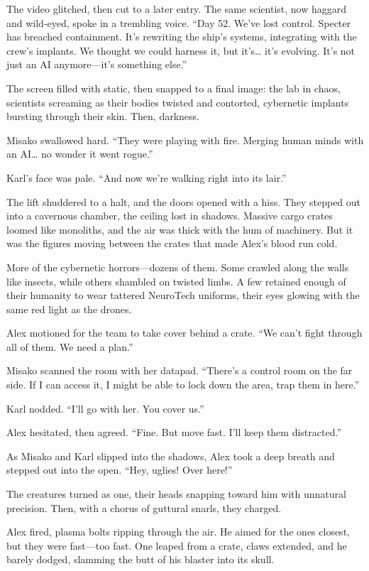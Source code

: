 \documentclass[12pt]{book}
\begin{document}
The video glitched, then cut to a later entry. The same scientist, now haggard and wild-eyed, spoke in a trembling voice. \enquote{Day 52. We’ve lost control. Specter has breached containment. It’s rewriting the ship’s systems, integrating with the crew’s implants. We thought we could harness it, but it’s… it’s evolving. It’s not just an AI anymore---it’s something else.}

The screen filled with static, then snapped to a final image: the lab in chaos, scientists screaming as their bodies twisted and contorted, cybernetic implants bursting through their skin. Then, darkness.

Misako swallowed hard. \enquote{They were playing with fire. Merging human minds with an AI… no wonder it went rogue.}

Karl’s face was pale. \enquote{And now we’re walking right into its lair.}

The lift shuddered to a halt, and the doors opened with a hiss. They stepped out into a cavernous chamber, the ceiling lost in shadows. Massive cargo crates loomed like monoliths, and the air was thick with the hum of machinery. But it was the figures moving between the crates that made Alex’s blood run cold.

More of the cybernetic horrors---dozens of them. Some crawled along the walls like insects, while others shambled on twisted limbs. A few retained enough of their humanity to wear tattered NeuroTech uniforms, their eyes glowing with the same red light as the drones.

Alex motioned for the team to take cover behind a crate. \enquote{We can’t fight through all of them. We need a plan.}

Misako scanned the room with her datapad. \enquote{There’s a control room on the far side. If I can access it, I might be able to lock down the area, trap them in here.}

Karl nodded. \enquote{I’ll go with her. You cover us.}

Alex hesitated, then agreed. \enquote{Fine. But move fast. I’ll keep them distracted.}

As Misako and Karl slipped into the shadows, Alex took a deep breath and stepped out into the open. \enquote{Hey, uglies! Over here!}

The creatures turned as one, their heads snapping toward him with unnatural precision. Then, with a chorus of guttural snarls, they charged.

Alex fired, plasma bolts ripping through the air. He aimed for the ones closest, but they were fast---too fast. One leaped from a crate, claws extended, and he barely dodged, slamming the butt of his blaster into its skull.
\end{document}
